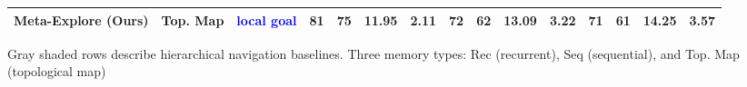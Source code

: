 \documentclass[10pt,twocolumn,letterpaper]{article}
\newcommand{\bluetext}[1]{\textcolor{blue}{#1}}
\begin{document}
\begin{table*}[ht]
\begin{tabular}{c|c|c|cccc|cccc|cccc}
\rowcolor{LightCyan}\textbf{Meta-Explore (Ours)} & Top. Map & \textbf{\bluetext{local goal}} & \textbf{81} & \textbf{75} & 11.95 & \textbf{2.11} & \textbf{72} & \textbf{62} & 13.09 & 3.22 & \textbf{71} & \textbf{61} & 14.25 & \textbf{3.57} \\
\bottomrule
\end{tabular}
\vspace{-0.2cm}
\caption{\small Comparison and evaluation results of the baselines and our model in the R2R Navigation Task. 
}
\vspace{-0.4cm}
\begin{center}{\footnotesize Gray shaded rows describe hierarchical navigation baselines. Three memory types: Rec\! (recurrent), Seq\! (sequential), and Top. Map\! (topological map)}\end{center}
\label{tab:r2r-baseline_results}\vspace{-0.5cm}
\end{table*}
\end{document}
